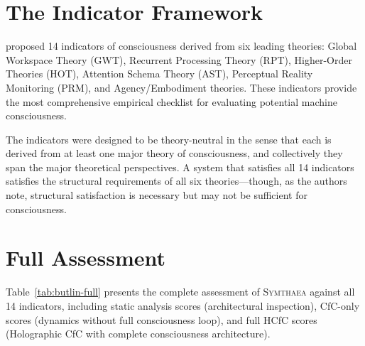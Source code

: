 \documentclass[12pt]{book}
\newcommand{\symthaea}{\textsc{Symthaea}}
\begin{document}
\section{The Indicator Framework}

\citet{butlin2023consciousness} proposed 14 indicators of consciousness derived from six leading theories: Global Workspace Theory (GWT), Recurrent Processing Theory (RPT), Higher-Order Theories (HOT), Attention Schema Theory (AST), Perceptual Reality Monitoring (PRM), and Agency/Embodiment theories. These indicators provide the most comprehensive empirical checklist for evaluating potential machine consciousness.

The indicators were designed to be theory-neutral in the sense that each is derived from at least one major theory of consciousness, and collectively they span the major theoretical perspectives. A system that satisfies all 14 indicators satisfies the structural requirements of all six theories---though, as the authors note, structural satisfaction is necessary but may not be sufficient for consciousness.

\section{Full Assessment}

Table~\ref{tab:butlin-full} presents the complete assessment of \symthaea{} against all 14 indicators, including static analysis scores (architectural inspection), CfC-only scores (dynamics without full consciousness loop), and full HCfC scores (Holographic CfC with complete consciousness architecture).
\end{document}
